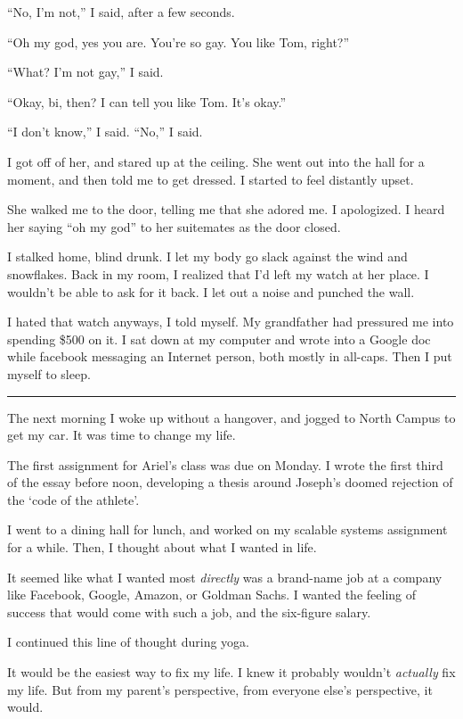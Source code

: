 ``No, I'm not,'' I said, after a few seconds.

``Oh my god, yes you are.  You're so gay.  You like Tom, right?''

``What?  I'm not gay,'' I said.

``Okay, bi, then?  I can tell you like Tom.  It's okay.''

``I don't know,'' I said.  ``No,'' I said.

I got off of her, and stared up at the ceiling.  She went out into the hall for
a moment, and then told me to get dressed.  I started to feel distantly upset.

She walked me to the door, telling me that she adored me.  I apologized.  I
heard her saying ``oh my god'' to her suitemates as the door closed.

I stalked home, blind drunk.  I let my body go slack against the wind and
snowflakes.  Back in my room, I realized that I'd left my watch at her place.  I
wouldn't be able to ask for it back.  I let out a noise and punched the wall.

I hated that watch anyways, I told myself.  My grandfather had pressured me into
spending \$500 on it.   I sat down at my computer and wrote into a Google doc
while facebook messaging an Internet person, both mostly in all-caps.  Then I
put myself to sleep.

\plainfancybreak{12pt}{2}{}

The next morning I woke up without a hangover, and jogged to North Campus to get
my car.  It was time to change my life.

The first assignment for Ariel's class was due on Monday.  I wrote the first
third of the essay before noon, developing a thesis around Joseph's doomed
rejection of the `code of the athlete'.

I went to a dining hall for lunch, and worked on my scalable systems assignment
for a while.  Then, I thought about what I wanted in life.

It seemed like what I wanted most \textit{directly} was a brand-name job at a
company like Facebook, Google, Amazon, or Goldman Sachs.  I wanted the feeling
of success that would come with such a job, and the six-figure salary.

I continued this line of thought during yoga.

It would be the easiest way to fix my life.  I knew it probably wouldn't
\textit{actually} fix my life.  But from my parent's perspective, from everyone
else's perspective, it would.


